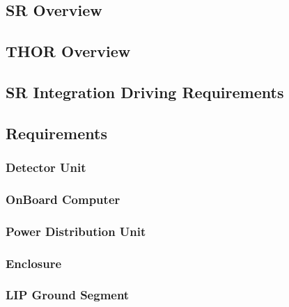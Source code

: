 
\subsection{SR Overview}

\subsection{THOR Overview}

\subsection{SR Integration Driving Requirements}

\subsection{Requirements}

\subsubsection{Detector Unit}

\subsubsection{OnBoard Computer}

\subsubsection{Power Distribution Unit}

\subsubsection{Enclosure}

\subsubsection{LIP Ground Segment}